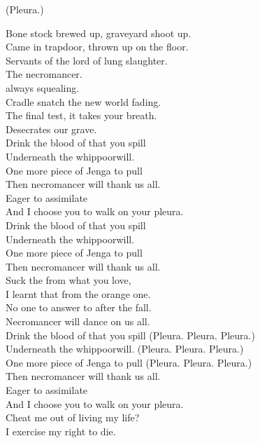 


(Pleura.)

Bone stock brewed up, graveyard shoot up. \\
Came in trapdoor, thrown up on the floor. \\
Servants of the lord of lung slaughter. \\
The necromancer. \\

 always squealing. \\
Cradle snatch the new world fading. \\
The final test, it takes your breath. \\
Desecrates our grave. \\

Drink the blood of that you spill \\
Underneath the whippoorwill. \\
One more piece of Jenga to pull \\
Then necromancer will thank us all. \\

Eager to assimilate \\
And I choose you to walk on your pleura. \\

Drink the blood of that you spill \\
Underneath the whippoorwill. \\
One more piece of Jenga to pull \\
Then necromancer will thank us all. \\

Suck the  from what you love, \\
I learnt that from the orange one. \\
No one to answer to after the fall. \\
Necromancer will dance on us all. \\

Drink the blood of that you spill (Pleura. Pleura. Pleura.) \\
Underneath the whippoorwill. (Pleura. Pleura. Pleura.) \\
One more piece of Jenga to pull (Pleura. Pleura. Pleura.) \\
Then necromancer will thank us all. \\

Eager to assimilate \\
And I choose you to walk on your pleura. \\
Cheat me out of living my life? \\
I exercise my right to die. \\

